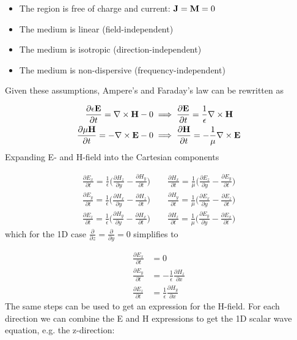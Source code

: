 \begin{itemize}
\item The region is free of charge and current: $\bold{J} = \bold{M} = 0$
\item The medium is linear (field-independent)
\item The medium is isotropic (direction-independent)
\item The medium is non-dispersive (frequency-independent)
\end{itemize}
Given these assumptions, Ampere's and Faraday's law can be rewritten as

\begin{align}
  \frac{\partial \epsilon \bold{E}}{\partial t} = \nabla \times \bold{H} - 0 & \implies \frac{\partial \bold{E}}{\partial t} = \frac{1}{\epsilon} \nabla \times \bold{H} \\
\frac{\partial \mu \bold{H}}{\partial t} =  - \nabla \times \bold{E} - 0 & \implies \frac{\partial \bold{H}}{\partial t} = - \frac{1}{\mu} \nabla \times \bold{E}
\end{align}
Expanding E- and H-field into the Cartesian components 

\begin{align}
  \frac{\partial E_x}{\partial t} = \frac{1}{\epsilon} \big(\frac{\partial H_z}{\partial y} - \frac{\partial H_y}{\partial t} \big) \qquad  
  \frac{\partial H_x}{\partial t} = \frac{1}{\mu} \big(\frac{\partial E_z}{\partial y} - \frac{\partial E_y}{\partial t} \big)\\
  \frac{\partial E_y}{\partial t} = \frac{1}{\epsilon} \big(\frac{\partial H_x}{\partial y} - \frac{\partial H_z}{\partial t} \big) \qquad 
  \frac{\partial H_y}{\partial t} = \frac{1}{\mu} \big(\frac{\partial E_x}{\partial y} - \frac{\partial E_z}{\partial t} \big) \\
  \frac{\partial E_z}{\partial t} = \frac{1}{\epsilon} \big(\frac{\partial H_y}{\partial y} - \frac{\partial H_x}{\partial t} \big) \qquad 
  \frac{\partial H_z}{\partial t} = \frac{1}{\mu} \big(\frac{\partial E_y}{\partial y} - \frac{\partial E_x}{\partial t} \big)
\end{align}
which for the 1D case $\frac{\partial}{\partial z} = \frac{\partial}{\partial y} = 0$ simplifies to 

\begin{align}
  \frac{\partial E_x}{\partial t} &= 0 \\
  \frac{\partial E_y}{\partial t} &= - \frac{1}{\epsilon} \frac{\partial H_z}{\partial x}\\
  \frac{\partial E_z}{\partial t} &= \frac{1}{\epsilon} \frac{\partial H_y}{\partial x}
\end{align}
The same steps can be used to get an expression for the H-field. For each direction we can combine the E and H expressions to get the 1D scalar wave equation, e.g. the z-direction\cite{taflove2000computional}: 

